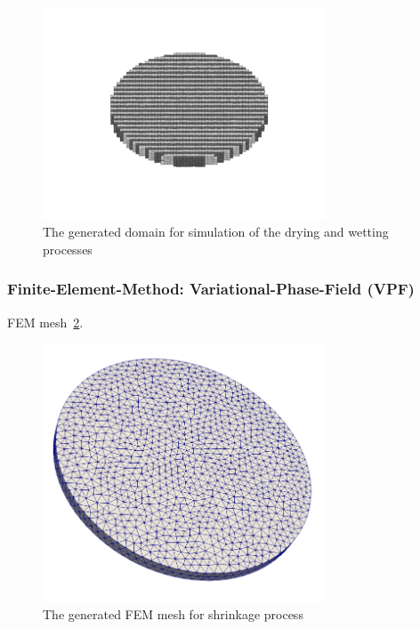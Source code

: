 \begin{figure}[!ht]
\centering
\includegraphics[width=0.75\textwidth]{figures/Amir_ME6_Lattice_Setup.png}
\caption{The generated domain for simulation of the drying and wetting processes}
\label{fig:Amir_ME6_Lattice_Setup}
\end{figure} 





\subsubsection*{Finite-Element-Method: Variational-Phase-Field (VPF)}
FEM mesh~\ref{fig:ME5_VPF_setup}.

\begin{figure}[!ht]
\centering
\includegraphics[width=0.75\textwidth]{figures/ME5_VPF_mesh.png}
\caption{The generated FEM mesh for shrinkage process}
\label{fig:ME5_VPF_setup}
\end{figure} 
